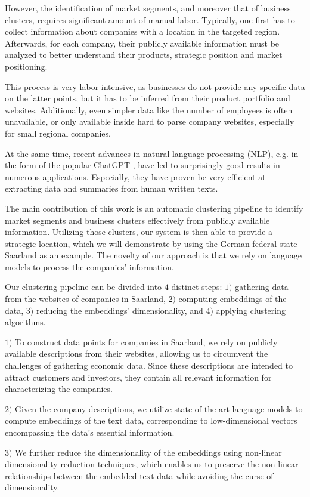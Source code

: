 \documentclass[conference]{IEEEtran}
\begin{document}
However, the identification of market segments, and moreover that of business clusters, requires significant amount of manual labor. Typically, one first has to collect information about companies with a location in the targeted region. Afterwards, for each company, their publicly available information must be analyzed to better understand their products, strategic position and market positioning. 

This process is very labor-intensive, as businesses do not provide any specific data on the latter points, but it has to be inferred from their product portfolio and websites. Additionally, even simpler data like the number of employees is often unavailable, or only available inside hard to parse company websites, especially for small regional companies.

At the same time, recent advances in natural language processing (NLP), e.g. in the form of the popular ChatGPT \cite{chatgpt}, have led to surprisingly good results in numerous applications. Especially, they have proven be very efficient at extracting data and summaries from human written texts.

The main contribution of this work is an automatic clustering pipeline to identify market segments and business clusters effectively from publicly available information. Utilizing those clusters, our system is then able to provide a strategic location, which we will demonstrate by using the German federal state Saarland as an example. The novelty of our approach is that we rely on language models to process the companies' information. 

Our clustering pipeline can be divided into $4$ distinct steps: $1)$ gathering data from the websites of companies in Saarland, $2)$ computing embeddings of the data, $3)$ reducing the embeddings' dimensionality, and $4)$ applying clustering algorithms.

$1)$ To construct data points for companies in Saarland, we rely on publicly available descriptions from their websites, allowing us to circumvent the challenges of gathering economic data. Since these descriptions are intended to attract customers and investors, they contain all relevant information for characterizing the companies.

$2)$ Given the company descriptions, we utilize state-of-the-art language models to compute embeddings of the text data, corresponding to low-dimensional vectors encompassing the data's essential information. 

$3)$ We further reduce the dimensionality of the embeddings using non-linear dimensionality reduction techniques, which enables us to preserve the non-linear relationships between the embedded text data while avoiding the curse of dimensionality. 
\end{document}
